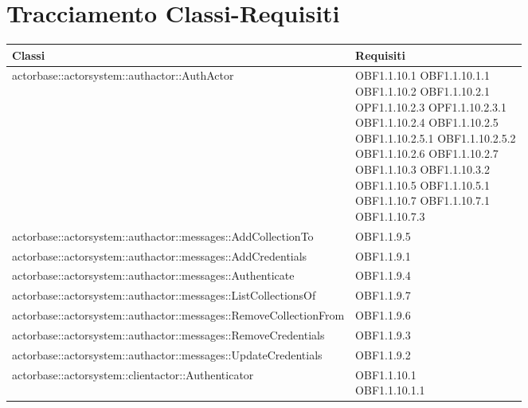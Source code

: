 \documentclass{scalatekids-article}
\begin{document}
\section{Tracciamento Classi-Requisiti}
\begin{longtable}[H]{|p{11.5cm}|p{5.5cm}|}
\hline
\textbf{Classi} & \textbf{Requisiti}\\
\hline
actorbase::actorsystem::authactor::AuthActor & \multiLineCell[t]{OBF1.1.10.1 OBF1.1.10.1.1\\OBF1.1.10.2 OBF1.1.10.2.1\\OPF1.1.10.2.3 OPF1.1.10.2.3.1\\OBF1.1.10.2.4 OBF1.1.10.2.5\\OBF1.1.10.2.5.1 OBF1.1.10.2.5.2\\OBF1.1.10.2.6 OBF1.1.10.2.7\\OBF1.1.10.3 OBF1.1.10.3.2\\OBF1.1.10.5 OBF1.1.10.5.1\\OBF1.1.10.7 OBF1.1.10.7.1\\OBF1.1.10.7.3}\\
\hline
actorbase::actorsystem::authactor::messages::AddCollectionTo & \multiLineCell[t]{OBF1.1.9.5\\}\\
\hline
actorbase::actorsystem::authactor::messages::AddCredentials & \multiLineCell[t]{OBF1.1.9.1\\}\\
\hline
actorbase::actorsystem::authactor::messages::Authenticate & \multiLineCell[t]{OBF1.1.9.4\\}\\
\hline
actorbase::actorsystem::authactor::messages::ListCollectionsOf & \multiLineCell[t]{OBF1.1.9.7\\}\\
\hline
actorbase::actorsystem::authactor::messages::RemoveCollectionFrom & \multiLineCell[t]{OBF1.1.9.6\\}\\
\hline
actorbase::actorsystem::authactor::messages::RemoveCredentials & \multiLineCell[t]{OBF1.1.9.3\\}\\
\hline
actorbase::actorsystem::authactor::messages::UpdateCredentials & \multiLineCell[t]{OBF1.1.9.2\\}\\
\hline
actorbase::actorsystem::clientactor::Authenticator & \multiLineCell[t]{OBF1.1.10.1\\OBF1.1.10.1.1\\}\\

\end{longtable}
\end{document}
